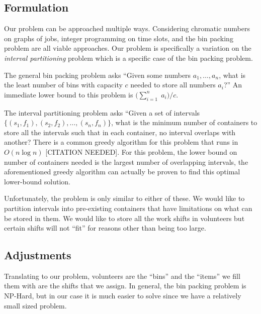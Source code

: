 \documentclass[11pt]{article}
\theoremstyle{definition}
\begin{document}
\begin{multicols}{2}
\section{Formulation}
Our problem can be approached multiple ways.
Considering chromatic numbers on graphs of jobs, integer programming on time slots, and the bin packing problem are all viable approaches.
Our problem is specifically a variation on the \textit{interval partitioning} problem which is a specific case of the bin packing problem.

The general bin packing problem asks ``Given some numbers $a_1, \ldots, a_n$, what is the least number of bins with capacity $c$ needed to store all numbers $a_i$?''
An immediate lower bound to this problem is $\big(\sum_{i = 1}^{n}\;a_i\big)/c$.

The interval partitioning problem asks ``Given a set of intervals $\{(s_1, f_1), (s_2, f_2), \ldots, (s_n, f_n)\}$, what is the minimum number of containers to store all the intervals such that in each container, no interval overlaps with another?
There is a common greedy algorithm for this problem that runs in $O(n\log n)$ [CITATION NEEDED].
For this problem, the lower bound on number of containers needed is the largest number of overlapping intervals, the aforementioned greedy algorithm can actually be proven to find this optimal lower-bound solution.

Unfortunately, the problem is only similar to either of these.
We would like to partition intervals into pre-existing containers that have limitations on what can be stored in them.
We would like to store all the work shifts in volunteers but certain shifts will not ``fit'' for reasons other than being too large.

\subsection{Adjustments}
Translating to our problem, volunteers are the ``bins'' and the ``items'' we fill them with are the shifts that we assign.
In general, the bin packing problem is NP-Hard, but in our case it is much easier to solve since we have a relatively small sized problem.


\end{multicols}
\end{document}
